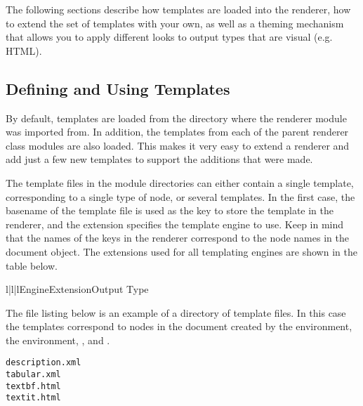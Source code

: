 The following sections describe how templates are loaded into the
renderer, how to extend the set of templates with your own, as well
as a theming mechanism that allows you to apply different looks to
output types that are visual (e.g. HTML).

\subsection{Defining and Using Templates}

By default, templates are loaded from the directory where the
renderer module was imported from.  In addition, the templates from
each of the parent renderer class modules are also loaded.  This makes
it very easy to extend a renderer and add just a few new templates
to support the additions that were made.

The template files in the module directories can either contain a single
template, corresponding to a single type of node, or several templates.
In the first case, the basename of the template file is used as the key to
store the template in the renderer, and the extension specifies the template
engine to use. Keep in mind that the names of the keys in the renderer
correspond to the node names in the document object. The extensions used for
all templating engines are shown in the table below.

\begin{tableiii}{l|l|l}{}{Engine}{Extension}{Output Type}
\end{tableiii}

The file listing below is an example of a directory of template files.
In this case the templates correspond to nodes in the document created
by the  environment, the 
environment, , and .
\begin{verbatim}
description.xml
tabular.xml
textbf.html
textit.html
\end{verbatim}

